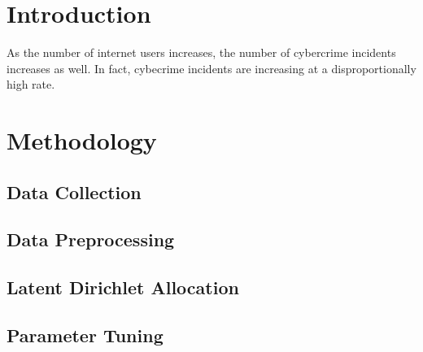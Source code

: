 \documentclass[12pt,english,titlepage,a4paper]{article}
\begin{document}

\tableofcontents
\pagebreak


\section*{Introduction}

As the number of internet users increases, the number of cybercrime incidents increases as well. In fact, cybecrime incidents are increasing at a disproportionally high rate. 


\pagebreak


\section{Methodology}

\subsection{Data Collection}

\subsection{Data Preprocessing}

\subsection{Latent Dirichlet Allocation}

\subsection{Parameter Tuning}



\pagebreak
\begin{thebibliography}{ccccc}
\end{thebibliography}
\end{document}

